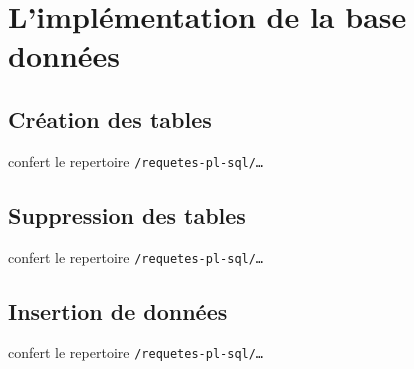 \chapter{L'implémentation de la base données}

\section{Création des tables}
confert le repertoire \texttt{/requetes-pl-sql/\dots}

\section{Suppression des tables}
confert le repertoire \texttt{/requetes-pl-sql/\dots}

\section{Insertion de données}
confert le repertoire \texttt{/requetes-pl-sql/\dots}

